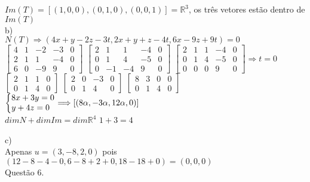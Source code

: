 \documentclass[12pt]{article}
\begin{document}
$Im(T)=[(1,0,0),(0,1,0),(0,0,1)]=\mathds{R}^{3}$, os três vetores estão dentro de $Im(T)$\\

\noindent b)\\

$N(T)\Longrightarrow(4x+y-2z-3t,2x+y+z-4t,6x-9z+9t)=0$\\

$\begin{bmatrix}
	4 & 1 & -2 & -3 & 0 \\
	2 & 1 & 1 & -4 & 0 \\
	6 & 0 & -9 & 9 & 0
\end{bmatrix}$\qquad
$\begin{bmatrix}
	2 & 1 & 1 & -4 & 0 \\
	0 & 1 & 4 & -5 & 0 \\
	0 & -1 & -4 & 9 & 0
\end{bmatrix}$\qquad
$\begin{bmatrix}
	2 & 1 & 1 & -4 & 0 \\
	0 & 1 & 4 & -5 & 0 \\
	0 & 0 & 0 & 9 & 0
\end{bmatrix}\Longrightarrow t=0$\\

$\begin{bmatrix}
	2 & 1 & 1 & 0 \\
	0 & 1 & 4 & 0
\end{bmatrix}$\qquad
$\begin{bmatrix}
	2 & 0 & -3 & 0 \\
	0 & 1 & 4 & 0
\end{bmatrix}$\qquad
$\begin{bmatrix}
	8 & 3 & 0 & 0 \\
	0 & 1 & 4 & 0
\end{bmatrix}$\qquad
$\left\{\begin{array}{@{}l@{}}
	8x+3y=0\\
	y+4z=0
\end{array}\right.\Longrightarrow [(8\alpha,-3\alpha,12\alpha,0)]$\\

$dimN+dimIm=dim\mathds{R}^{4}$\qquad\qquad
$1+3=4$\quad\checkmark

\noindent c)\\

Apenas $u=(3,-8,2,0)$ pois $(12-8-4-0,6-8+2+0,18-18+0)=(0,0,0)$\\

\noindent Questão 6.\\
\end{document}
